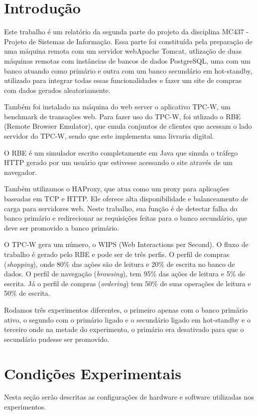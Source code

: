 \documentclass[11pt,twoside]{article}
\begin{document}
\section{Introdução}
Este trabalho \'e um relat\'orio da segunda parte do projeto da disciplina MC437 - Projeto de Sistemas de Informação. Essa parte foi constituída pela preparação de uma m\'aquina remota com um servidor  webApache Tomcat, utlização de duas máquinas remotas com instâncias de bancos de dados PostgreSQL, uma com um banco atuando como primário e outra com um banco secundário em hot-standby, utilizado para integrar todas essas funcionalidades e fazer um site de compras com dados gerados aleatoriamente.

    Também foi instalado na máquina do web server o aplicativo TPC-W, um benchmark de transa\c{c}\~oes web. Para fazer uso do TPC-W, foi utlizado o RBE (Remote Browser Emulator), que emula conjuntos de clientes que acessam o lado servidor do TPC-W, sendo que este implementa uma livraria digital.
    
    O RBE \'e um simulador escrito completamente em Java que simula o tr\'afego HTTP gerado por um usu\'ario que estivesse acessando o site atrav\'es de um navegador.

    Também utilizamos o HAProxy, que atua como um proxy para aplicações baseadas em TCP e HTTP. Ele oferece alta disponibilidade e balanceamento de carga para servidores web. Neste trabalho, sua função é de detectar falha do banco primário e redirecionar as requisições feitas para o banco secundário, que deve ser promovido a banco primário.

    O TPC-W gera um n\'umero, o WIPS (Web Interactions per Second). O fluxo de trabalho é gerado pelo RBE e pode ser de tr\^es perfis. O perfil de compras (\textit{shopping}), onde 80\% das a\c{c}\~oes são de leitura e 20\% de escrita no banco de dados. O perfil de navega\c{c}\~ao (\textit{browsing}), tem 95\% das a\c{c}\~oes de leitura e 5\% de escrita. J\'a o perfil de compras (\textit{ordering}) tem 50\% de suas opera\c{c}\~oes de leitura e 50\% de escrita.

    Rodamos três experimentos diferentes, o primeiro apenas com o banco primário ativo, o segundo com o primário ligado e o secundário ligado em hot-standby e o terceiro onde na metade do experimento, o primário era desativado para que o secundário pudesse ser promovido.

\setlength{\parindent}{4ex}


\section{Condições Experimentais}
\setlength{\parindent}{4ex}
     Nesta se\c{c}\~ao ser\~ao descritas as configura\c{c}\~oes de hardware e software utilizadas nos experimentos.
\end{document}
